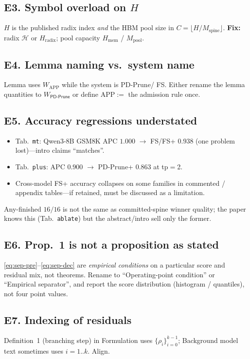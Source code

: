 \documentclass[11pt]{article}
\newcommand{\sys}{\textsf{PD-Prune}\xspace}
\newcommand{\plus}{\textsf{PD-Prune+}}
\newcommand{\Work}{W}
\begin{document}
\subsection{E3. Symbol overload on $H$}
$H$ is the published radix index \emph{and} the HBM pool size in
$C=\lfloor H/M_{\mathrm{spine}}\rfloor$.
\textbf{Fix:} radix $\mathcal{H}$ or $H_{\mathrm{radix}}$; pool capacity
$H_{\mathrm{mem}}$ / $M_{\mathrm{pool}}$.

\subsection{E4. Lemma naming vs.\ system name}
Lemma uses $\Work_{\mathrm{APP}}$ while the system is \sys / FS.
Either rename the lemma quantities to $\Work_{\sys}$ or define APP$:=$ the
admission rule once.

\subsection{E5. Accuracy regressions understated}
\begin{itemize}
  \item Tab.~\texttt{mt}: Qwen3-8B GSM8K APC $1.000$ $\to$ FS/FS+ $0.938$
        (one problem lost)---intro claims ``matches''.
  \item Tab.~\texttt{plus}: APC $0.900$ $\to$ \plus{} $0.863$ at tp$=$2.
  \item Cross-model FS+ accuracy collapses on some families in commented /
        appendix tables---if retained, must be discussed as a limitation.
\end{itemize}
Any-finished $16/16$ is not the same as committed-spine winner quality;
the paper knows this (Tab.~\texttt{ablate}) but the abstract/intro sell only
the former.

\subsection{E6. Prop.~1 is not a proposition as stated}
\eqref{eq:sep-pre}--\eqref{eq:sep-dec} are \emph{empirical conditions} on a
particular score and residual mix, not theorems. Rename to
``Operating-point condition'' or ``Empirical separator'', and report the
score distribution (histogram / quantiles), not four point values.

\subsection{E7. Indexing of residuals}
Definition~1 (branching step) in Formulation uses $\{\rho_i\}_{i=0}^{k-1}$;
Background model text sometimes uses $i=1..k$. Align.
\end{document}
